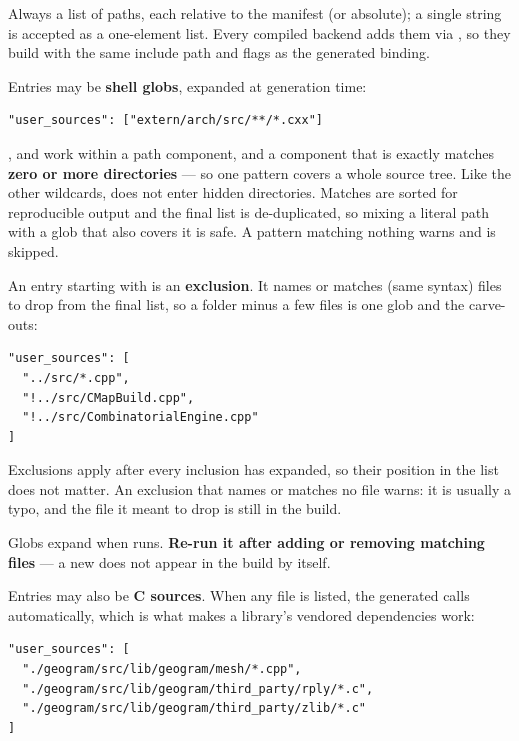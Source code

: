 Always a list of paths, each relative to the manifest (or absolute); a single
string is accepted as a one-element list. Every compiled backend adds them via
, so they build with the same include path and
flags as the generated binding.

Entries may be \textbf{shell globs}, expanded at generation time:

\begin{lstlisting}[style=json]
"user_sources": ["extern/arch/src/**/*.cxx"]
\end{lstlisting}

\code{*},  and \code{[\ldots]} work within a path component, and a
component that is exactly \code{**} matches \textbf{zero or more directories}
--- so one pattern covers a whole source tree. Like the other wildcards,
\code{**} does not enter hidden directories. Matches are sorted for reproducible
output and the final list is de-duplicated, so mixing a literal path with a glob
that also covers it is safe. A pattern matching nothing warns and is skipped.

An entry starting with \code{!} is an \textbf{exclusion}. It names or matches
(same syntax) files to drop from the final list, so a folder minus a few files
is one glob and the carve-outs:

\begin{lstlisting}[style=json]
"user_sources": [
  "../src/*.cpp",
  "!../src/CMapBuild.cpp",
  "!../src/CombinatorialEngine.cpp"
]
\end{lstlisting}

Exclusions apply after every inclusion has expanded, so their position in the
list does not matter. An exclusion that names or matches no file warns: it is
usually a typo, and the file it meant to drop is still in the build.

\begin{warn}
Globs expand when  runs. \textbf{Re-run it after adding or
removing matching files} --- a new  does not appear in the build by
itself.
\end{warn}

Entries may also be \textbf{C sources}. When any  file is listed, the
generated  calls  automatically,
which is what makes a library's vendored dependencies work:

\begin{lstlisting}[style=json]
"user_sources": [
  "./geogram/src/lib/geogram/mesh/*.cpp",
  "./geogram/src/lib/geogram/third_party/rply/*.c",
  "./geogram/src/lib/geogram/third_party/zlib/*.c"
]
\end{lstlisting}

